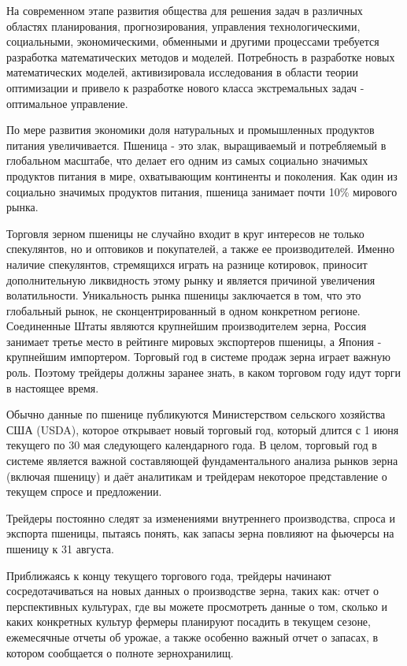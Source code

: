 На современном этапе развития общества для решения задач в различных областях планирования, прогнозирования, управления технологическими, социальными, экономическими, обменными и другими процессами требуется разработка математических методов и моделей. Потребность в разработке новых математических моделей, активизировала исследования в области теории оптимизации и привело к разработке нового класса экстремальных задач - оптимальное управление. 


По мере развития экономики доля натуральных и промышленных продуктов питания увеличивается. Пшеница - это злак, выращиваемый и потребляемый в глобальном масштабе, что делает его одним из самых социально значимых продуктов питания в мире, охватывающим континенты и поколения. Как один из социально значимых продуктов питания, пшеница занимает почти 10\% мирового рынка.


Торговля зерном пшеницы не случайно входит в круг интересов не только спекулянтов, но и оптовиков и покупателей, а также ее производителей. Именно наличие спекулянтов, стремящихся играть на разнице котировок, приносит дополнительную ликвидность этому рынку и является причиной увеличения волатильности. Уникальность рынка пшеницы заключается в том, что это глобальный рынок, не сконцентрированный в одном конкретном регионе. Соединенные Штаты являются крупнейшим производителем зерна, Россия занимает
третье место в рейтинге мировых экспортеров пшеницы, а Япония - крупнейшим импортером. Торговый год в системе продаж зерна играет важную роль. Поэтому трейдеры должны заранее знать, в каком торговом году идут торги в настоящее время.


Обычно данные по пшенице публикуются Министерством сельского хозяйства США (USDA), которое открывает новый торговый год, который длится с 1 июня текущего по 30 мая следующего календарного года. В целом, торговый год в системе является важной составляющей фундаментального анализа рынков зерна (включая пшеницу) и даёт аналитикам и трейдерам некоторое представление о текущем спросе и предложении.


Трейдеры постоянно следят за изменениями внутреннего производства, спроса и экспорта пшеницы, пытаясь понять, как запасы зерна повлияют на фьючерсы на пшеницу к 31 августа.


Приближаясь к концу текущего торгового года, трейдеры начинают сосредотачиваться на новых данных о производстве зерна, таких как: отчет о перспективных культурах, где вы можете просмотреть данные о том, сколько и каких конкретных культур фермеры планируют посадить в текущем сезоне, ежемесячные отчеты об урожае, а также особенно важный отчет о запасах, в котором сообщается о полноте зернохранилищ.


